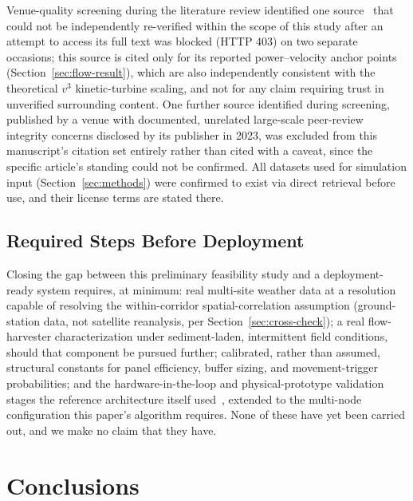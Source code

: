 \documentclass[electronics,article,submit,moreauthors]{Definitions/mdpi}
\begin{document}
Venue-quality screening during the literature review identified one source~\cite{ref66} that could not be independently re-verified within the scope of this study after an attempt to access its full text was blocked (HTTP 403) on two separate occasions; this source is cited only for its reported power--velocity anchor points (Section~\ref{sec:flow-result}), which are also independently consistent with the theoretical $v^3$ kinetic-turbine scaling, and not for any claim requiring trust in unverified surrounding content. One further source identified during screening, published by a venue with documented, unrelated large-scale peer-review integrity concerns disclosed by its publisher in 2023, was excluded from this manuscript's citation set entirely rather than cited with a caveat, since the specific article's standing could not be confirmed. All datasets used for simulation input (Section~\ref{sec:methods}) were confirmed to exist via direct retrieval before use, and their license terms are stated there.

\subsection{Required Steps Before Deployment}

Closing the gap between this preliminary feasibility study and a deployment-ready system requires, at minimum: real multi-site weather data at a resolution capable of resolving the within-corridor spatial-correlation assumption (ground-station data, not satellite reanalysis, per Section~\ref{sec:cross-check}); a real flow-harvester characterization under sediment-laden, intermittent field conditions, should that component be pursued further; calibrated, rather than assumed, structural constants for panel efficiency, buffer sizing, and movement-trigger probabilities; and the hardware-in-the-loop and physical-prototype validation stages the reference architecture itself used~\cite{ref101}, extended to the multi-node configuration this paper's algorithm requires. None of these have yet been carried out, and we make no claim that they have.

\section{Conclusions}
\label{sec:conclusion}
\end{document}
